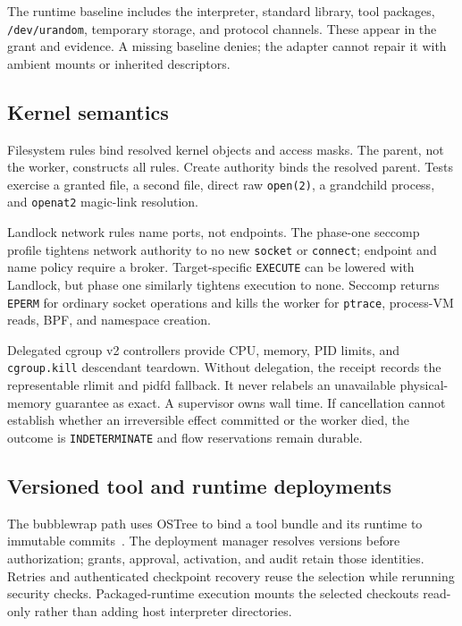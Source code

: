 \documentclass[letterpaper,twocolumn,10pt]{article}
\newcommand{\code}[1]{\texttt{#1}}
\begin{document}
The runtime baseline includes the interpreter, standard library, tool packages,
\code{/dev/urandom}, temporary storage, and protocol channels. These appear in
the grant and evidence. A missing baseline denies; the adapter cannot repair it
with ambient mounts or inherited descriptors.

\subsection{Kernel semantics}

Filesystem rules bind resolved kernel objects and access masks. The parent, not
the worker, constructs all rules. Create authority binds the resolved parent.
Tests exercise a granted file, a second file, direct raw \code{open(2)}, a
grandchild process, and \code{openat2} magic-link resolution.

Landlock network rules name ports, not endpoints. The phase-one seccomp profile
tightens network authority to no new \code{socket} or \code{connect}; endpoint
and name policy require a broker. Target-specific \code{EXECUTE} can be lowered
with Landlock, but phase one similarly tightens execution to none. Seccomp
returns \code{EPERM} for ordinary socket operations and kills the worker for
\code{ptrace}, process-VM reads, BPF, and namespace creation.

Delegated cgroup v2 controllers provide CPU, memory, PID limits, and
\code{cgroup.kill} descendant teardown. Without delegation, the receipt records
the representable rlimit and pidfd fallback. It never relabels an unavailable
physical-memory guarantee as exact. A supervisor owns wall time. If cancellation
cannot establish whether an irreversible effect committed or the worker died,
the outcome is \code{INDETERMINATE} and flow reservations remain durable.

\subsection{Versioned tool and runtime deployments}
\label{sec:deployments}

The bubblewrap path uses OSTree to bind a tool bundle and its runtime to
immutable commits~\cite{flatpak,ostree,bubblewrap}. The deployment manager resolves
versions before authorization; grants, approval, activation, and audit retain
those identities. Retries and authenticated checkpoint recovery reuse the
selection while rerunning security checks. Packaged-runtime execution mounts
the selected checkouts read-only rather than adding host interpreter directories.
\end{document}
